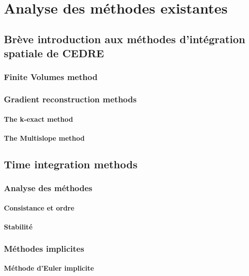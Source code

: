 


\maketitle
\tableofcontents
{}
\pagebreak

\chapter{Analyse des méthodes existantes}
  \section{Brève introduction aux méthodes d'intégration spatiale de CEDRE}
    \subsection{Finite Volumes method}
    \subsection{Gradient reconstruction methods}
      \subsubsection{The k-exact method}
      \subsubsection{The Multislope method}
  \section{Time integration methods}
    \subsection{Analyse des méthodes}
      \subsubsection{Consistance et ordre}
      \subsubsection{Stabilité}
    \subsection{Méthodes implicites}
      \subsubsection{Méthode d'Euler implicite}

